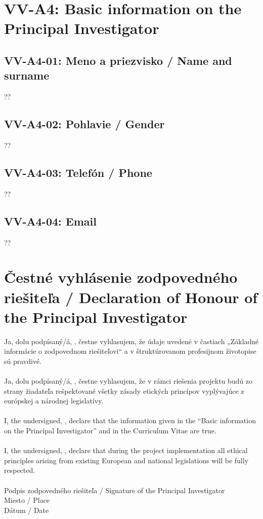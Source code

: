 \section*{VV-A4: Basic information on the Principal Investigator}
\subsection*{VV-A4-01: Meno a priezvisko / Name and surname}
??
\subsection*{VV-A4-02: Pohlavie / Gender}
??
\subsection*{VV-A4-03: Telefón / Phone}
??
\subsection*{VV-A4-04: Email}
??

\section*{Čestné vyhlásenie zodpovedného riešiteľa / Declaration of Honour of the Principal Investigator}
Ja, dolu podpísaný/á, , čestne vyhlasujem, že údaje uvedené v častiach „Základné informácie o zodpovednom riešiteľovi“ a v štruktúrovanom profesijnom životopise sú pravdivé. \\\\
Ja, dolu podpísaný/á, , čestne vyhlasujem, že v rámci riešenia projektu budú zo strany žiadateľa rešpektované všetky zásady etických princípov vyplývajúce z európskej a národnej legislatívy. \\\\
I, the undersigned, , declare that the information given in the “Basic information on the Principal Investigator” and in the Curriculum Vitae are true. \\\\
I, the undersigned, , declare that during the project implementation all ethical principles arising from existing European and national legislations will be fully respected.\\
\\Podpis zodpovedného riešiteľa / Signature of the Principal Investigator \\
Miesto / Place \\
Dátum / Date